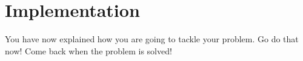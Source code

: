 \chapter{Implementation}
\label{chapter:implementation}

You have now explained how you are going to tackle your problem. 
Go do that now! Come back when the problem is solved!

